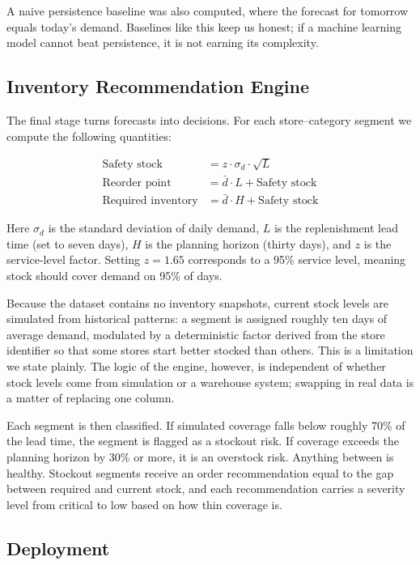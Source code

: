 \documentclass[11pt,a4paper]{article}
\begin{document}
A naive persistence baseline was also computed, where the forecast for tomorrow equals today's demand. Baselines like this keep us honest; if a machine learning model cannot beat persistence, it is not earning its complexity.

\subsection{Inventory Recommendation Engine}\label{sec:invmethod}

The final stage turns forecasts into decisions. For each store--category segment we compute the following quantities:

\begin{align}
\text{Safety stock} &= z \cdot \sigma_d \cdot \sqrt{L} \\
\text{Reorder point} &= \bar{d} \cdot L + \text{Safety stock} \\
\text{Required inventory} &= \bar{d} \cdot H + \text{Safety stock}
\end{align}

Here $\sigma_d$ is the standard deviation of daily demand, $L$ is the replenishment lead time (set to seven days), $H$ is the planning horizon (thirty days), and $z$ is the service-level factor. Setting $z = 1.65$ corresponds to a 95\% service level, meaning stock should cover demand on 95\% of days.

Because the dataset contains no inventory snapshots, current stock levels are simulated from historical patterns: a segment is assigned roughly ten days of average demand, modulated by a deterministic factor derived from the store identifier so that some stores start better stocked than others. This is a limitation we state plainly. The logic of the engine, however, is independent of whether stock levels come from simulation or a warehouse system; swapping in real data is a matter of replacing one column.

Each segment is then classified. If simulated coverage falls below roughly 70\% of the lead time, the segment is flagged as a stockout risk. If coverage exceeds the planning horizon by 30\% or more, it is an overstock risk. Anything between is healthy. Stockout segments receive an order recommendation equal to the gap between required and current stock, and each recommendation carries a severity level from critical to low based on how thin coverage is.

\subsection{Deployment}\label{sec:deployment}
\end{document}
